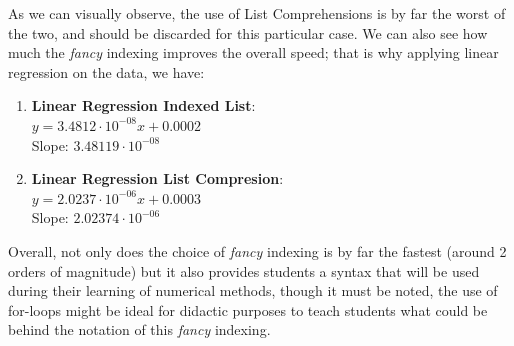 As we can visually observe, the use of List Comprehensions is by far the worst of the two, and should be discarded for this particular case. We can also see how much the \textit{fancy} indexing improves the overall speed; that is why applying linear regression on the data, we have:
\begin{enumerate}
    \item \textbf{Linear Regression Indexed List}: \\
        $y = 3.4812\cdot10^{-08}x + 0.0002$ \\
        Slope: $3.48119\cdot10^{-08}$
    \item \textbf{Linear Regression List Compresion}: \\
        $y = 2.0237\cdot10^{-06}x + 0.0003$ \\
        Slope: $2.02374\cdot10^{-06}$
\end{enumerate}

Overall, not only does the choice of \textit{fancy} indexing is by far the fastest (around 2 orders of magnitude) but it also provides students a syntax that will be used during their learning of numerical methods, though it must be noted, the use of for-loops might be ideal for didactic purposes to teach students what could be behind the notation of this \textit{fancy} indexing.





